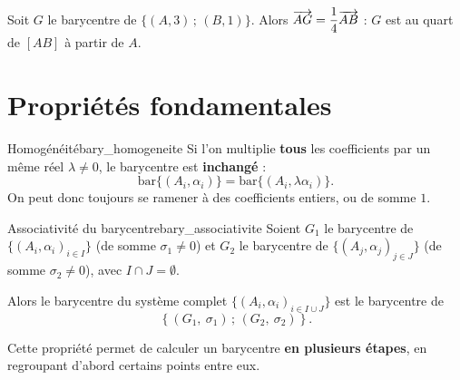 \begin{exemple}
	Soit $G$ le barycentre de $\{(A,3)\,;\,(B,1)\}$. Alors
	$\overrightarrow{AG} = \dfrac{1}{4}\overrightarrow{AB}$ : $G$ est au quart de $[AB]$ à partir de $A$.
\end{exemple}


\section{Propriétés fondamentales}

\begin{propriete}{Homogénéité}{bary_homogeneite}
	Si l'on multiplie \textbf{tous} les coefficients par un même réel $\lambda \neq 0$,
	le barycentre est \textbf{inchangé} :
	$$
	\text{bar}\{(A_i,\alpha_i)\} = \text{bar}\{(A_i,\lambda\alpha_i)\}.
	$$
	On peut donc toujours se ramener à des coefficients entiers, ou de somme $1$.
\end{propriete}

\begin{propriete}{Associativité du barycentre}{bary_associativite}
	Soient $G_1$ le barycentre de $\{(A_i, \alpha_i)_{i \in I}\}$ (de somme
	$\sigma_1 \neq 0$) et $G_2$ le barycentre de $\{(A_j, \alpha_j)_{j \in J}\}$
	(de somme $\sigma_2 \neq 0$), avec $I \cap J = \emptyset$.

	Alors le barycentre du système complet $\{(A_i, \alpha_i)_{i \in I \cup J}\}$
	est le barycentre de
	$$
	\left\{(G_1,\ \sigma_1)\,;\,(G_2,\ \sigma_2)\right\}.
	$$
\end{propriete}

\remarque
Cette propriété permet de calculer un barycentre \textbf{en plusieurs étapes},
en regroupant d'abord certains points entre eux.

\begin{center}
\end{center}

